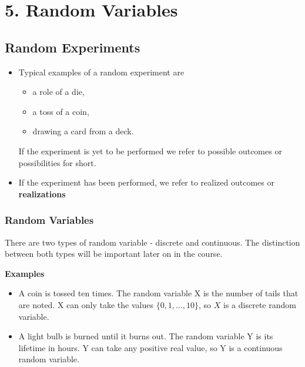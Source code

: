 \documentclass[]{report}
\begin{document}
\chapter{5. Random Variables}





\section{Random Experiments}

\begin{itemize}

\item Typical examples of a random experiment are

\begin{itemize}
\item { a role of a die,}

\item { a toss of a coin,}

\item { drawing a card from a deck.}
\end{itemize}If the experiment is yet to be performed we refer to possible outcomes
or possibilities for short. \vspace{0.2cm}
\item If the experiment has been performed, we
refer to realized outcomes or \textbf{realizations}
\end{itemize}


{
\subsection{Random Variables}
There are two types of random variable - discrete and continuous. The distinction between both types will be important later on in the course.\\ \bigskip

\textbf{Examples}
\begin{itemize}
\item A coin is tossed ten times. The random variable X is the number of tails that are noted.
X can only take the values $\{0, 1, ..., 10\}$, so $X$ is a discrete random variable.
\item A light bulb is burned until it burns out. The random variable Y is its lifetime in hours.
Y can take any positive real value, so Y is a continuous random variable.
\end{itemize}
}
\end{document}
